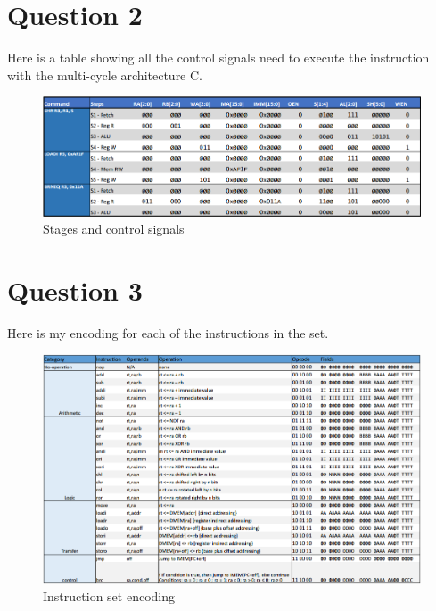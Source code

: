 \documentclass[10pt]{article}
\begin{document}
\newpage

\section{Question 2}
    	
        Here is a table showing all the control signals need to execute the instruction with the multi-cycle architecture C.
    
        \begin{figure}[ht]
          \centering
          \includegraphics[width=1\textwidth]{tables/Q2ControlSignals}
          \caption{Stages and control signals}
        \end{figure}
        
        
	\section{Question 3}
    
    Here is my encoding for each of the instructions in the set.
    
    \begin{figure}[ht]
      \centering
      \includegraphics[width=1\textwidth]{tables/InstructionSet}
      \caption{Instruction set encoding}
    \end{figure}

	
	\newpage
	\printbibliography
	\newpage
	
    
    
    
            
         
    
    
\end{document}
